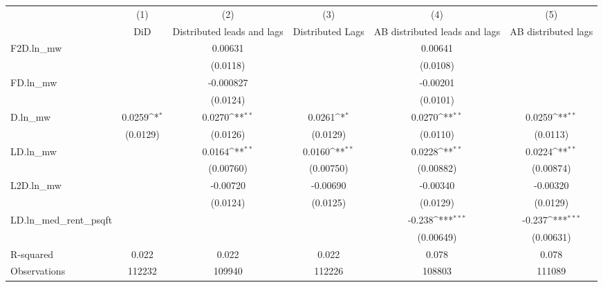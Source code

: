{
\def\sym#1{\ifmmode^{#1}\else\(^{#1}\)\fi}
\begin{tabular}{l*{5}{c}}
\hline\hline
          &\multicolumn{1}{c}{(1)}&\multicolumn{1}{c}{(2)}&\multicolumn{1}{c}{(3)}&\multicolumn{1}{c}{(4)}&\multicolumn{1}{c}{(5)}\\
          &\multicolumn{1}{c}{DiD}&\multicolumn{1}{c}{Distributed leads and lags}&\multicolumn{1}{c}{Distributed Lags}&\multicolumn{1}{c}{AB distributed leads and lags}&\multicolumn{1}{c}{AB distributed lags}\\
\hline
F2D.ln\_mw &                  &  0.00631         &                  &  0.00641         &                  \\
          &                  & (0.0118)         &                  & (0.0108)         &                  \\
[1em]
FD.ln\_mw  &                  &-0.000827         &                  & -0.00201         &                  \\
          &                  & (0.0124)         &                  & (0.0101)         &                  \\
[1em]
D.ln\_mw   &   0.0259\sym{*}  &   0.0270\sym{**} &   0.0261\sym{*}  &   0.0270\sym{**} &   0.0259\sym{**} \\
          & (0.0129)         & (0.0126)         & (0.0129)         & (0.0110)         & (0.0113)         \\
[1em]
LD.ln\_mw  &                  &   0.0164\sym{**} &   0.0160\sym{**} &   0.0228\sym{**} &   0.0224\sym{**} \\
          &                  &(0.00760)         &(0.00750)         &(0.00882)         &(0.00874)         \\
[1em]
L2D.ln\_mw &                  & -0.00720         & -0.00690         & -0.00340         & -0.00320         \\
          &                  & (0.0124)         & (0.0125)         & (0.0129)         & (0.0129)         \\
[1em]
LD.ln\_med\_rent\_psqft&                  &                  &                  &   -0.238\sym{***}&   -0.237\sym{***}\\
          &                  &                  &                  &(0.00649)         &(0.00631)         \\
\hline
R-squared &    0.022         &    0.022         &    0.022         &    0.078         &    0.078         \\
Observations&   112232         &   109940         &   112226         &   108803         &   111089         \\
\hline\hline
\end{tabular}
}
